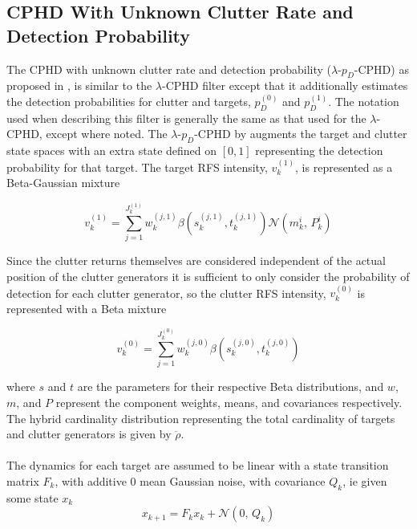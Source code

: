 \documentclass{article}
\newcommand{\clut}{{(0)}}
\newcommand{\tgt}{{(1)}}
\begin{document}
\subsection*{CPHD With Unknown Clutter Rate and Detection Probability}
The CPHD with unknown clutter rate and detection probability ($\lambda$-$p_D$-CPHD) as proposed in \cite{cphd}, is similar to the $\lambda$-CPHD filter except that it additionally estimates the detection probabilities for clutter and targets, $p_D^{(0)}$ and $p_D^{(1)}$. The notation used when describing this filter is generally the same as that used for the $\lambda$-CPHD, except where noted. The $\lambda$-$p_D$-CPHD by augments the target and clutter state spaces with an extra state defined on $[0, 1]$ representing the detection probability for that target. The target RFS intensity, $v_k^{(1)}$, is represented as a Beta-Gaussian mixture

\begin{equation}
  \label{eq:v1_bm}
  v_k^\tgt = \sum_{j=1}^{J^\tgt _k}w_k^{(j,1)} \beta(s_k^{(j, 1)}, t_k^{(j, 1)})\mathcal{N}(m_k^i,\,P_k^i)
\end{equation}

Since the clutter returns themselves are considered independent of the actual position of the clutter generators it is sufficient to only consider the probability of detection for each clutter generator, so the clutter RFS intensity, $v_k^{(0)}$ is represented with a Beta mixture

\begin{equation}
  \label{eq:v0_bm}
  v_k^\clut = \sum_{j=1}^{J^\clut _k}w_k^{(j, 0)}\beta(s_k^{(j, 0)}, t_k^{(j, 0)})
\end{equation}

where $s$ and $t$ are the parameters for their respective Beta distributions, and $w$, $m$, and $P$ represent the component weights, means, and covariances respectively. The hybrid cardinality distribution representing the total cardinality of targets and clutter generators is given by $\ddot{\rho}$. \\
\\
The dynamics for each target are assumed to be linear with a state transition matrix $F_k$, with additive 0 mean Gaussian noise, with covariance $Q_k$, ie given some state $x_k$
\begin{equation}
  \label{eq:lpd_tgt_dynamics}
  x_{k+1} = F_kx_k + \mathcal{N}(0,\,Q_k)
\end{equation}
\end{document}
